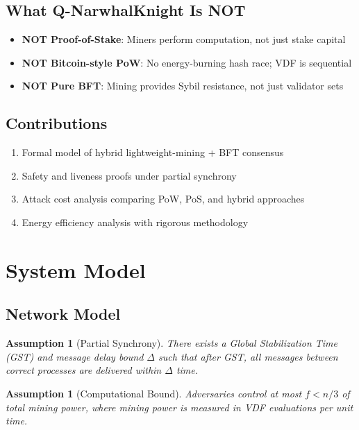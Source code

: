 \documentclass[11pt,a4paper]{article}
\newtheorem{assumption}[theorem]{Assumption}
\begin{document}
\subsection{What Q-NarwhalKnight Is NOT}

\begin{itemize}
    \item \textbf{NOT Proof-of-Stake}: Miners perform computation, not just stake capital
    \item \textbf{NOT Bitcoin-style PoW}: No energy-burning hash race; VDF is sequential
    \item \textbf{NOT Pure BFT}: Mining provides Sybil resistance, not just validator sets
\end{itemize}

\subsection{Contributions}

\begin{enumerate}
    \item Formal model of hybrid lightweight-mining + BFT consensus
    \item Safety and liveness proofs under partial synchrony
    \item Attack cost analysis comparing PoW, PoS, and hybrid approaches
    \item Energy efficiency analysis with rigorous methodology
\end{enumerate}

\section{System Model}

\subsection{Network Model}

\begin{assumption}[Partial Synchrony]
\label{assum:partial-sync}
There exists a Global Stabilization Time (GST) and message delay bound $\Delta$ such that after GST, all messages between correct processes are delivered within $\Delta$ time.
\end{assumption}

\begin{assumption}[Computational Bound]
\label{assum:compute}
Adversaries control at most $f < n/3$ of total mining power, where mining power is measured in VDF evaluations per unit time.
\end{assumption}
\end{document}
